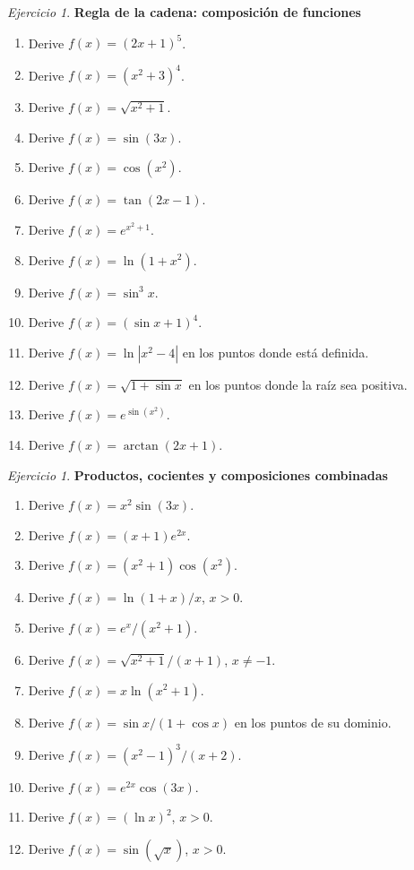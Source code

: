 \documentclass[12pt]{article}
\theoremstyle{remark}
\newtheorem{Ejer}[definicion]{Ejercicio}
\begin{document}
\begin{Ejer}\textbf{Regla de la cadena: composición de funciones}
\begin{enumerate}[resume=banco]
\item Derive $f(x)=(2x+1)^5$.
\item Derive $f(x)=(x^2+3)^4$.
\item Derive $f(x)=\sqrt{x^2+1}$.
\item Derive $f(x)=\sin(3x)$.
\item Derive $f(x)=\cos(x^2)$.
\item Derive $f(x)=\tan(2x-1)$.
\item Derive $f(x)=e^{x^2+1}$.
\item Derive $f(x)=\ln(1+x^2)$.
\item Derive $f(x)=\sin^3x$.
\item Derive $f(x)=(\sin x+1)^4$.
\item Derive $f(x)=\ln|x^2-4|$ en los puntos donde está definida.
\item Derive $f(x)=\sqrt{1+\sin x}$ en los puntos donde la raíz sea positiva.
\item Derive $f(x)=e^{\sin(x^2)}$.
\item Derive $f(x)=\arctan(2x+1)$.
\end{enumerate}
\end{Ejer}

\begin{Ejer}\textbf{Productos, cocientes y composiciones combinadas}
\begin{enumerate}[resume=banco]
\item Derive $f(x)=x^2\sin(3x)$.
\item Derive $f(x)=(x+1)e^{2x}$.
\item Derive $f(x)=(x^2+1)\cos(x^2)$.
\item Derive $f(x)=\ln(1+x)/x$, $x>0$.
\item Derive $f(x)=e^x/(x^2+1)$.
\item Derive $f(x)=\sqrt{x^2+1}/(x+1)$, $x\ne-1$.
\item Derive $f(x)=x\ln(x^2+1)$.
\item Derive $f(x)=\sin x/(1+\cos x)$ en los puntos de su dominio.
\item Derive $f(x)=(x^2-1)^3/(x+2)$.
\item Derive $f(x)=e^{2x}\cos(3x)$.
\item Derive $f(x)=(\ln x)^2$, $x>0$.
\item Derive $f(x)=\sin(\sqrt{x})$, $x>0$.
\end{enumerate}
\end{Ejer}
\end{document}
